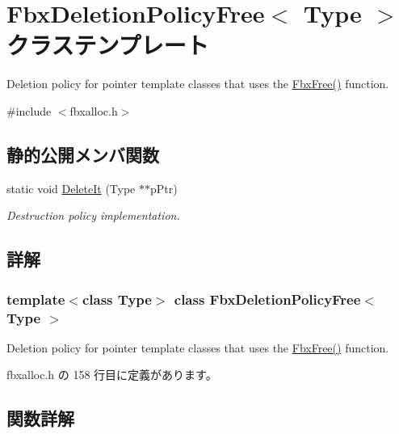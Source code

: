 \hypertarget{class_fbx_deletion_policy_free}{}\section{Fbx\+Deletion\+Policy\+Free$<$ Type $>$ クラステンプレート}
\label{class_fbx_deletion_policy_free}


Deletion policy for pointer template classes that uses the \hyperlink{fbxalloc_8h_a8252906713d55f4c56e7ba84221d3852}{Fbx\+Free()} function.  




{\ttfamily \#include $<$fbxalloc.\+h$>$}

\subsection*{静的公開メンバ関数}
\begin{DoxyCompactItemize}
\item 
static void \hyperlink{class_fbx_deletion_policy_free_a6b0c1df911d0480122de9bf31a4fd4a5}{Delete\+It} (Type $\ast$$\ast$p\+Ptr)
\begin{DoxyCompactList}\small\item\em Destruction policy implementation. \end{DoxyCompactList}\end{DoxyCompactItemize}


\subsection{詳解}
\subsubsection*{template$<$class Type$>$\newline
class Fbx\+Deletion\+Policy\+Free$<$ Type $>$}

Deletion policy for pointer template classes that uses the \hyperlink{fbxalloc_8h_a8252906713d55f4c56e7ba84221d3852}{Fbx\+Free()} function. 

 fbxalloc.\+h の 158 行目に定義があります。



\subsection{関数詳解}
\mbox{\label{class_fbx_deletion_policy_free_a6b0c1df911d0480122de9bf31a4fd4a5}} 
